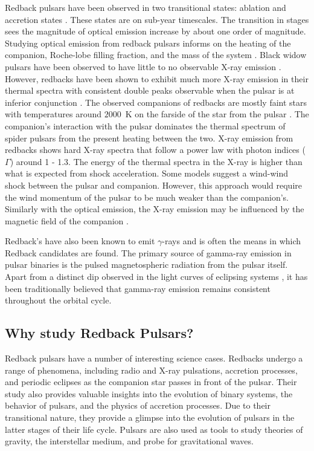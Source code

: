 Redback pulsars have been observed in two transitional states: ablation and accretion states \citep{papitto_transitional_2022}. These states are on sub-year timescales. The transition in stages sees the magnitude of optical emission increase by about one order of magnitude. Studying optical emission from redback pulsars informs on the heating of the companion, Roche-lobe filling fraction, and the mass of the system \citep{archibald_radio_2009, roberts_x-ray_2017}. Black widow pulsars have been observed to have little to no observable X-ray emission \citep{roberts_x-ray_2017}. However, redbacks have been shown to exhibit much more X-ray emission in their thermal spectra with consistent double peaks observable when the pulsar is at inferior conjunction \citep{roberts_x-ray_2017}. The observed companions of redbacks are mostly faint stars with temperatures around $2000$~K on the farside of the star from the pulsar \citep{breton_discovery_2013}. The companion's interaction with the pulsar dominates the thermal spectrum of spider pulsars from the present heating between the two. X-ray emission from redbacks shows hard X-ray spectra that follow a power law with photon indices ($\Gamma$) around 1 - 1.3. The energy of the thermal spectra in the X-ray is higher than what is expected from shock acceleration. Some models suggest a wind-wind shock between the pulsar and companion. However, this approach would require the wind momentum of the pulsar to be much weaker than the companion's. Similarly with the optical emission, the X-ray emission may be influenced by the magnetic field of the companion \citep{papitto_transitional_2022}. \ 

Redback's have also been known to emit $\gamma$-rays and is often the means in which Redback candidates are found. The primary source of gamma-ray emission in pulsar binaries is the pulsed magnetospheric radiation from the pulsar itself. Apart from a distinct dip observed in the light curves of eclipsing systems \citep{clark_neutron_2023, corbet_gamma-ray_2022}, it has been traditionally believed that gamma-ray emission remains consistent throughout the orbital cycle.

\subsection{Why study Redback Pulsars?}

Redback pulsars have a number of interesting science cases. Redbacks undergo a range of phenomena, including radio and X-ray pulsations, accretion processes, and periodic eclipses as the companion star passes in front of the pulsar. Their study also provides valuable insights into the evolution of binary systems, the behavior of pulsars, and the physics of accretion processes. Due to their transitional nature, they provide a glimpse into the evolution of pulsars in the latter stages of their life cycle. Pulsars are also used as tools to study theories of gravity, the interstellar medium, and probe for gravitational waves.

